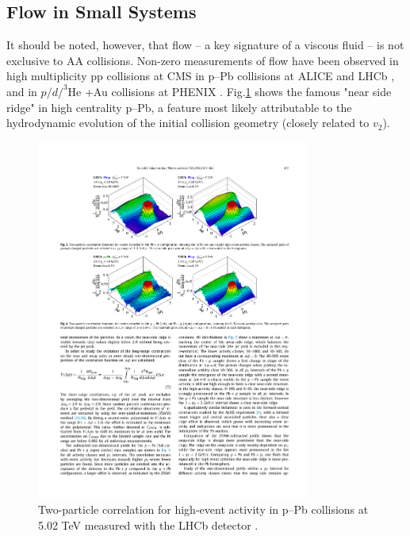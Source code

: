 
\subsection{Flow in Small Systems}

It should be noted, however, that flow -- a key signature of a viscous fluid -- is not exclusive to AA collisions. Non-zero measurements of flow have been observed in high multiplicity pp collisions at CMS \cite{Khachatryan2010} in p--Pb collisions at ALICE and LHCb \cite{Abelev2013,Aaij2016}, and in $p/d/^3$He +Au collisions at PHENIX \cite{PHENIXCollaboration2018}. Fig.\ref{fig:near_side_ridge} shows the famous "near side ridge" in high centrality p--Pb, a feature most likely attributable to the hydrodynamic evolution of the initial collision geometry (closely related to $v_2$).

\begin{figure}[htpb]
  \centering
  \includegraphics[width=0.8\textwidth]{Introduction/near_side_ridge.pdf}
  \caption{Two-particle correlation for high-event activity in p–Pb collisions at 5.02 TeV measured with the LHCb detector \cite{Aaij2016}.}
  \label{fig:near_side_ridge}
\end{figure}

